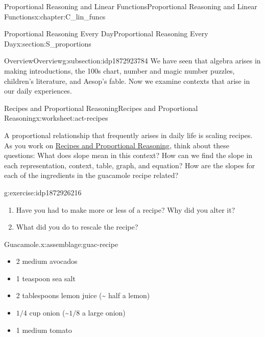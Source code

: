 \documentclass[oneside,10pt,]{book}
\numberwithin{equation}{chapter}
\begin{document}
\begin{chapterptx}{Proportional Reasoning and Linear Functions}{}{Proportional Reasoning and Linear Functions}{}{}{x:chapter:C_lin_funcs}
\begin{sectionptx}{Proportional Reasoning Every Day}{}{Proportional Reasoning Every Day}{}{}{x:section:S_proportions}
%
%
\typeout{************************************************}
\typeout{************************************************}
%
\begin{subsectionptx}{Overview}{}{Overview}{}{}{g:subsection:idp1872923784}
We have seen that algebra arises in making introductions, the 100s chart, number and magic number puzzles, children's literature, and Aesop's fable. Now we examine contexts that arise in our daily experiences.%
\end{subsectionptx}
%
%
\typeout{************************************************}
\typeout{************************************************}
%
\begin{worksheet-subsection}{Recipes and Proportional Reasoning}{}{Recipes and Proportional Reasoning}{}{}{x:worksheet:act-recipes}
\begin{introduction}{}%
A proportional relationship that frequently arises in daily life is scaling recipes. As you work on \hyperref[x:worksheet:act-recipes]{Recipes and Proportional Reasoning}, think about these questions: What does slope mean in this context? How can we find the slope in each representation, context, table, graph, and equation? How are the slopes for each of the ingredients in the guacamole recipe related?%
\end{introduction}%
\begin{divisionexercise}{1}{}{}{g:exercise:idp1872926216}%
\begin{enumerate}[font=\bfseries,label=(\alph*),ref=\alph*]
\item{}Have you had to make more or less of a recipe? Why did you alter it?%
\item{}What did you do to rescale the recipe?%
\end{enumerate}
\end{divisionexercise}%
\begin{assemblage}{Guacamole.}{x:assemblage:guac-recipe}%
%
\begin{itemize}[label=\textbullet]
\item{}2 medium avocados%
\item{}1 teaspoon sea salt%
\item{}2 tablespoons lemon juice (\textasciitilde{} half a lemon)%
\item{}\(1/4\) cup onion (\textasciitilde{}\(1/8\) a large onion)%
\item{}1 medium tomato%

\end{itemize}
\end{assemblage}
\end{worksheet-subsection}
\end{sectionptx}
\end{chapterptx}
\end{document}
